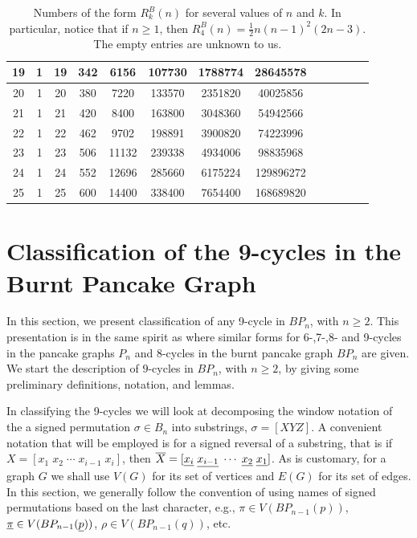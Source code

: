 \documentclass[final]{dmtcs-episciences}
\numberwithin{equation}{section}
\begin{document}
\begin{table}
{\begin{tabular}{|*{13}{c|}}
    \hline
    19 & 1 & 19 & 342 & 6156 & 107730 & 1788774 & 28645578 &  &  &  &  & \\
    \hline
    20 & 1 & 20 & 380 & 7220 & 133570 & 2351820 & 40025856 &  &  &  &  & \\
    \hline
    21 & 1 & 21 & 420 & 8400 & 163800 & 3048360 & 54942566 &  &  &  &  & \\
    \hline
    22 & 1 & 22 & 462 & 9702 & 198891 & 3900820 & 74223996 &  &  &  &  & \\
    \hline
    23 & 1 & 23 & 506 & 11132 & 239338 & 4934006 & 98835968 &  &  &  &  & \\
    \hline
    24 & 1 & 24 & 552 & 12696 & 285660 & 6175224 & 129896272 &  &  &  &  & \\
    \hline
    25 & 1 & 25 & 600 & 14400 & 338400 & 7654400 & 168689820 &  &  &  &  & \\
    \hline
\end{tabular}
}
\caption{Numbers of the form $R_k^B(n)$ for several values of $n$ and $k$. In particular, notice that if $n\geq1$, then $R_4^B(n)=\frac{1}{2} n(n-1)^2(2n-3)$. The empty entries are unknown to us.}
\label{tab:bn}
\end{table}

\section{Classification of the 9-cycles in the Burnt Pancake Graph}\label{sec:9cycles}

In this section, we present classification of any 9-cycle in $BP_n$, with $n\geq2$. This presentation is in the same spirit as \cite{BBP2018,KM10,KM11,KonMed,KM16} where similar forms for 6-,7-,8- and 9-cycles in the pancake graphs $P_n$ and 8-cycles in the burnt pancake graph $BP_n$ are given. We start the description of $9$-cycles in $BP_n$, with $n\geq2$, by giving some preliminary definitions, notation, and lemmas. 

In classifying the 9-cycles we will look at decomposing the window notation of the a signed permutation $\sigma \in B_n$ into substrings, $\sigma = [X Y Z]$. A convenient notation that will be employed is for a signed reversal of a substring, that is if $X=[x_1\;x_2\;\cdots\;x_{i-1}\;x_i]$, then $\overline{X}=[\uline{x_i}\;\uline{x_{i-1}}\;\cdots\;\uline{x_2}\;\uline{x_1}]$. As is customary, for a graph $G$ we shall use $V(G)$ for its set of vertices and $E(G)$ for its set of edges. In this section, we generally follow the convention of using names of signed permutations based on the last character, e.g., $\pi \in V(BP_{n-1}(p))$, $\uline{\pi} \in V(BP_{n-1}(\uline{p}))$, $\rho \in V(BP_{n-1}(q))$, etc. 
\end{document}

